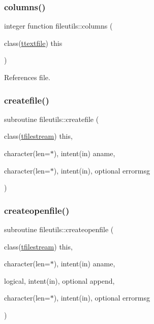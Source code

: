 \subsubsection{\texorpdfstring{columns()}{columns()}}
{\footnotesize\ttfamily integer function fileutils\+::columns (\begin{DoxyParamCaption}\item[{class(\mbox{\hyperlink{structfileutils_1_1ttextfile}{ttextfile}})}]{this }\end{DoxyParamCaption})\hspace{0.3cm}{\ttfamily [private]}}



References file.

\mbox{\label{namespacefileutils_a40850ce0c16a35137a51f9e4316d2599}} 
\subsubsection{\texorpdfstring{createfile()}{createfile()}}
{\footnotesize\ttfamily subroutine fileutils\+::createfile (\begin{DoxyParamCaption}\item[{class(\mbox{\hyperlink{structfileutils_1_1tfilestream}{tfilestream}})}]{this,  }\item[{character(len=$\ast$), intent(in)}]{aname,  }\item[{character(len=$\ast$), intent(in), optional}]{errormsg }\end{DoxyParamCaption})\hspace{0.3cm}{\ttfamily [private]}}

\mbox{\label{namespacefileutils_ae16c8e138a245fc238bc5e6d29b3415b}} 
\subsubsection{\texorpdfstring{createopenfile()}{createopenfile()}}
{\footnotesize\ttfamily subroutine fileutils\+::createopenfile (\begin{DoxyParamCaption}\item[{class(\mbox{\hyperlink{structfileutils_1_1tfilestream}{tfilestream}})}]{this,  }\item[{character(len=$\ast$), intent(in)}]{aname,  }\item[{logical, intent(in), optional}]{append,  }\item[{character(len=$\ast$), intent(in), optional}]{errormsg }\end{DoxyParamCaption})\hspace{0.3cm}{\ttfamily [private]}}

